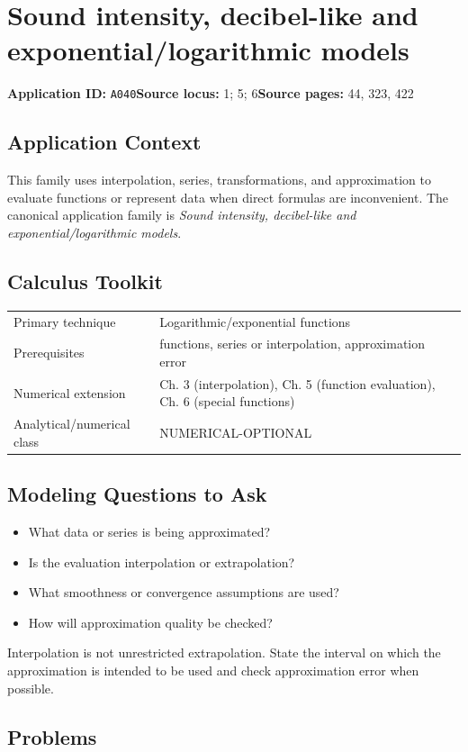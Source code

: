 \documentclass[11pt]{book}
\newcommand{\pid}[1]{\texttt{#1}}
\begin{document}
\chapter{Sound intensity, decibel-like and exponential/logarithmic models}\label{app:A040}
\textbf{Application ID:} \pid{A040}\quad \textbf{Source locus:} 1; 5; 6\quad \textbf{Source pages:} 44, 323, 422
\section*{Application Context}
This family uses interpolation, series, transformations, and approximation to evaluate functions or represent data when direct formulas are inconvenient. The canonical application family is \emph{Sound intensity, decibel-like and exponential/logarithmic models}.
\section*{Calculus Toolkit}
\begin{tabularx}{\textwidth}{@{}lX@{}}\toprule
Primary technique & Logarithmic/exponential functions \\
Prerequisites & functions, series or interpolation, approximation error \\
Numerical extension & Ch. 3 (interpolation), Ch. 5 (function evaluation), Ch. 6 (special functions) \\
Analytical/numerical class & NUMERICAL-OPTIONAL \\
\bottomrule\end{tabularx}
\section*{Modeling Questions to Ask}\begin{itemize}
\item What data or series is being approximated?
\item Is the evaluation interpolation or extrapolation?
\item What smoothness or convergence assumptions are used?
\item How will approximation quality be checked?
\end{itemize}
\begin{errorbox}Interpolation is not unrestricted extrapolation. State the interval on which the approximation is intended to be used and check approximation error when possible.\end{errorbox}
\section*{Problems}
\end{document}
